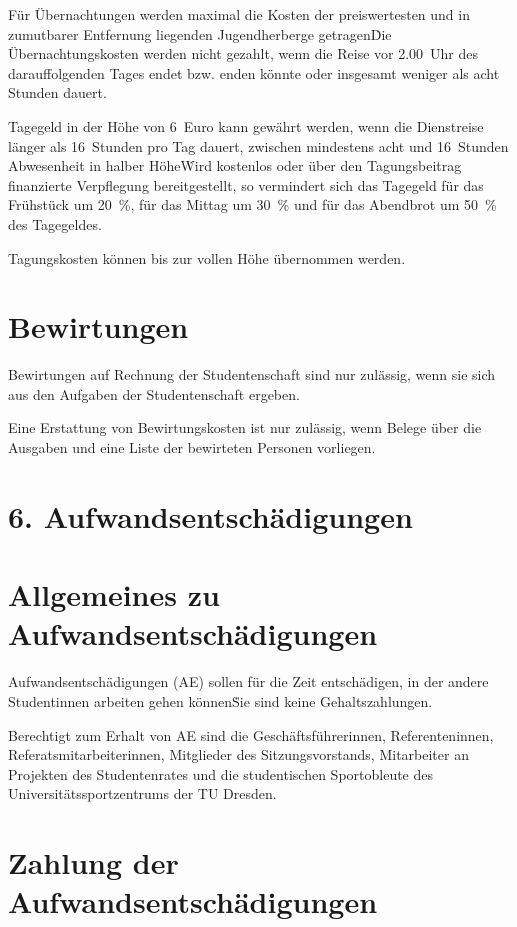 {\begin{multicols}{2}
\Abs \Satz Für Übernachtungen werden maximal die Kosten der preiswertesten und in zumutbarer Entfernung liegenden Jugendherberge getragen\. Die Übernachtungskosten werden nicht gezahlt, wenn die Reise vor 2.00~Uhr des darauffolgenden Tages endet bzw. enden könnte oder insgesamt weniger als acht Stunden dauert. 

\Abs \Satz Tagegeld in der Höhe von 6~Euro kann gewährt werden, wenn die Dienstreise länger als 16~Stunden pro Tag dauert, zwischen mindestens acht und 16~Stunden Abwesenheit in halber Höhe\. Wird kostenlos oder über den Tagungsbeitrag finanzierte Verpflegung bereitgestellt, so vermindert sich das Tagegeld für das Frühstück um 20~\%, für das Mittag um 30~\% und für das Abendbrot um 50~\% des Tagegeldes.

\Abs \Satz Tagungskosten können bis zur vollen Höhe übernommen werden.


\section{Bewirtungen}

\Abs \Satz Bewirtungen auf Rechnung der Studentenschaft sind nur zulässig, wenn sie sich aus den Aufgaben der Studentenschaft ergeben.

\Abs \Satz Eine Erstattung von Bewirtungskosten ist nur zulässig, wenn Belege über die Ausgaben und eine Liste der bewirteten Personen vorliegen.


\section*{6. Aufwandsentschädigungen}



\section{Allgemeines zu Aufwandsentschädigungen}

\Abs \Satz Aufwandsentschädigungen (AE) sollen für die Zeit entschädigen, in der andere Studentinnen arbeiten gehen können\. Sie sind keine Gehaltszahlungen.

\Abs \Satz Berechtigt zum Erhalt von AE sind die Geschäftsführerinnen, Referenteninnen, Referatsmitarbeiterinnen, Mitglieder des Sitzungsvorstands, Mitarbeiter an Projekten des Studentenrates und die studentischen Sportobleute des Universitätssportzentrums der TU Dresden.



\section{Zahlung der Aufwandsentschädigungen}


\end{multicols}}
